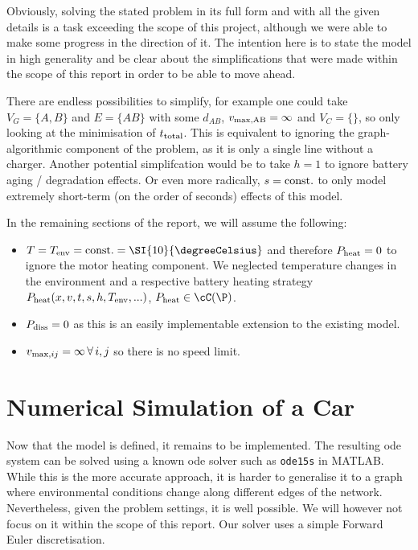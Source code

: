 \documentclass{prettytex/ox/mmsc-special-topic}
\begin{document}
  Obviously, solving the stated problem in its full form and with all the given details is a task exceeding the scope of this project, although we were able to make some progress in the direction of it.
  The intention here is to state the model in high generality and be clear about the simplifications that were made within the scope of this report in order to be able to move ahead.

  There are endless possibilities to simplify, for example one could take
  $V_G = \{A, B\}$ and $E = \{AB\}$ with some $d_{AB}$, $v_{\rm max, AB} = \infty$ and $V_C = \{\}$, so only looking at the minimisation of $t_{\rm total}$. This is equivalent to ignoring the graph-algorithmic component of the problem, as it is only a single line without a charger.
  Another potential simplifcation would be to take $h = 1$ to ignore battery aging / degradation effects. Or even more radically, $s = \rm const.$ to only model extremely short-term (on the order of seconds) effects of this model.

  In the remaining sections of the report, we will assume the following:
  \begin{itemize}
    \tightlist
    \item $T = T_{\rm env} = \rm const. = \SI{10}{\degreeCelsius}$ and therefore $P_{\rm heat} = 0$ to ignore the motor heating component. We neglected temperature changes in the environment and a respective battery heating strategy $P_{\rm heat}(x, v, t, s, h, T_{\rm env}, ...)$, $P_{\rm heat} \in \cC(\P)$.
    \item $P_{\rm diss} = 0$ as this is an easily implementable extension to the existing model.
    \item $v_{{\rm max}, ij} = \infty \,\forall\, i, j$ so there is no speed limit.
  \end{itemize}

  \section{Numerical Simulation of a Car}
  \label{sec:simulator}
  Now that the model is defined, it remains to be implemented.
  The resulting \gls{ode} system can be solved using a known \gls{ode} solver such as \texttt{ode15s} in MATLAB.
  While this is the more accurate approach, it is harder to generalise it to a graph where environmental conditions change along different edges of the network.
  Nevertheless, given the problem settings, it is well possible.
  We will however not focus on it within the scope of this report.
  Our solver uses a simple Forward Euler discretisation.
\end{document}
